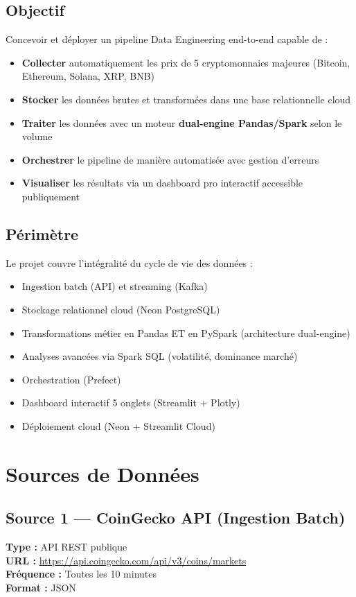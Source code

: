 \documentclass[12pt,a4paper]{article}
\begin{document}
\subsection{Objectif}
Concevoir et déployer un pipeline Data Engineering end-to-end capable de :
\begin{itemize}
    \item \textbf{Collecter} automatiquement les prix de 5 cryptomonnaies majeures (Bitcoin, Ethereum, Solana, XRP, BNB)
    \item \textbf{Stocker} les données brutes et transformées dans une base relationnelle cloud
    \item \textbf{Traiter} les données avec un moteur \textbf{dual-engine Pandas/Spark} selon le volume
    \item \textbf{Orchestrer} le pipeline de manière automatisée avec gestion d'erreurs
    \item \textbf{Visualiser} les résultats via un dashboard pro interactif accessible publiquement
\end{itemize}

\subsection{Périmètre}
Le projet couvre l'intégralité du cycle de vie des données :
\begin{itemize}[noitemsep]
    \item Ingestion batch (API) et streaming (Kafka)
    \item Stockage relationnel cloud (Neon PostgreSQL)
    \item Transformations métier en Pandas ET en PySpark (architecture dual-engine)
    \item Analyses avancées via Spark SQL (volatilité, dominance marché)
    \item Orchestration (Prefect)
    \item Dashboard interactif 5 onglets (Streamlit + Plotly)
    \item Déploiement cloud (Neon + Streamlit Cloud)
\end{itemize}

\section{Sources de Données}

\subsection{Source 1 --- CoinGecko API (Ingestion Batch)}
\textbf{Type :} API REST publique\\
\textbf{URL :} \url{https://api.coingecko.com/api/v3/coins/markets}\\
\textbf{Fréquence :} Toutes les 10 minutes\\
\textbf{Format :} JSON
\end{document}
